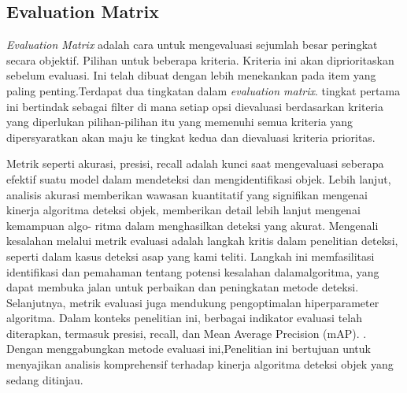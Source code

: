 \subsection{Evaluation Matrix}
\emph{Evaluation Matrix} adalah cara untuk mengevaluasi sejumlah besar peringkat secara objektif. Pilihan untuk beberapa kriteria. Kriteria ini akan diprioritaskan sebelum evaluasi. Ini telah dibuat dengan lebih menekankan pada item yang paling penting.Terdapat dua tingkatan dalam \emph{evaluation matrix}. tingkat pertama ini bertindak sebagai filter di mana setiap opsi dievaluasi berdasarkan kriteria yang diperlukan pilihan-pilihan itu
yang memenuhi semua kriteria yang dipersyaratkan akan maju ke tingkat kedua dan dievaluasi kriteria prioritas. 

Metrik seperti akurasi, presisi, recall adalah kunci saat mengevaluasi seberapa efektif suatu model dalam mendeteksi dan mengidentifikasi objek. 
Lebih lanjut, analisis akurasi memberikan wawasan kuantitatif yang signifikan mengenai
kinerja algoritma deteksi objek, memberikan detail lebih lanjut mengenai kemampuan algo-
ritma dalam menghasilkan deteksi yang akurat. Mengenali kesalahan melalui metrik evaluasi
adalah langkah kritis dalam penelitian deteksi, seperti dalam kasus deteksi asap yang kami
teliti. Langkah ini memfasilitasi identifikasi dan pemahaman tentang potensi kesalahan dalamalgoritma, yang dapat membuka jalan untuk perbaikan dan peningkatan metode deteksi. Selanjutnya, metrik evaluasi juga mendukung pengoptimalan hiperparameter algoritma.
Dalam konteks penelitian ini, berbagai indikator evaluasi telah diterapkan, termasuk presisi, recall, dan Mean Average Precision (mAP). . Dengan menggabungkan metode evaluasi ini,Penelitian ini bertujuan untuk menyajikan analisis komprehensif terhadap kinerja algoritma deteksi objek yang sedang ditinjau.

